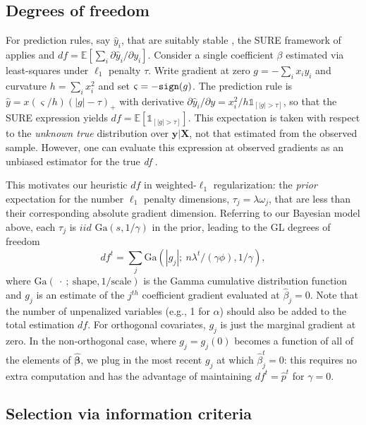 \documentclass[12pt]{article}
\newcommand{\bs}[1]{\boldsymbol{#1}}
\newcommand{\mr}[1]{\mathrm{#1}}
\newcommand{\bm}[1]{\mathbf{#1}}
\newcommand{\ds}[1]{\mathds{#1}}
\begin{document}
\subsection{Degrees of freedom}


For prediction rules, say $\hat y_i$, that are suitably stable \citep[i.e.,
Lipschitz; see][]{zou_degrees_2007}, the SURE framework of
\cite{stein_estimation_1981} applies and  $df =
\ds{E}\left[\sum_i \partial \hat y_i/\partial y_i\right]$.
Consider  a single coefficient $\beta$ estimated via least-squares under $\ell_1$
penalty $\tau$.   Write gradient at zero $g = -\sum_i x_iy_i$ and curvature $h
= \sum_i x_i^2$ and set $\varsigma = -{\tt sign}(g)$. The prediction rule is
$\hat y = x(\varsigma/h)(|g|-\tau)_+$ with  derivative $\partial\hat y_i/\partial y = x_i^2/h \ds{1}_{[|g|>\tau]}$, so that the SURE expression
yields $df = \ds{E}\left[ \ds{1}_{[|g|>\tau]} \right]$.   This expectation is
taken with respect to the {\it unknown true} distribution over $\bm{y} |
\bm{X}$, not that estimated from the observed sample.  However, 
 one can evaluate this expression at observed
gradients as an unbiased estimator for the true \textit{df} \citep[e.g.,][]{zou_degrees_2007}.

This motivates our heuristic $df$ in weighted-$\ell_1$ regularization:  the {\it prior} expectation for the number  $\ell_1$ penalty dimensions, $\tau_j = \lambda \omega_j$, that are less than their corresponding absolute gradient dimension.  Referring to our Bayesian model above, each $\tau_j$ is $iid$ $\mr{Ga}(s,1/\gamma)$ in the prior,
leading to the GL degrees of freedom
\begin{equation}
\label{edf} df^t = \sum_j \mr{Ga}(|g_{j}|;~n\lambda^t/(\gamma\phi),
1/\gamma), \end{equation} where $\mr{Ga}(~\cdot~;~\mr{shape}, 1/\mr{scale})$
is the Gamma cumulative distribution function and $g_j$ is an estimate of  the
$j^{th}$ coefficient gradient evaluated at $\hat\beta_j=0$. Note that
the number of unpenalized variables (e.g., 1 for $\alpha$) should also be
added to the total  estimation $df$.  For  orthogonal covariates,  $g_j$ is
just the marginal gradient at zero. In the non-orthogonal case, where $g_{j} =
g_j(0)$ becomes a function of all of the elements of $\bs{\hat\beta}$, we plug
in the most recent $g_j$ at which $\hat\beta^t_j=0$:  this requires no extra
computation and has the advantage of maintaining $df^t =
\hat p^t$ for $\gamma = 0$.

\subsection{Selection via information criteria}
\end{document}
